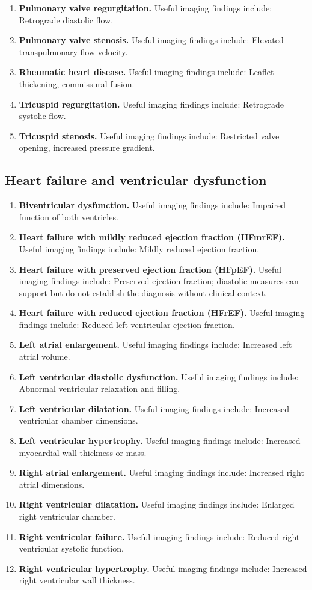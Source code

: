 \begin{enumerate}[leftmargin=*,itemsep=0.45em,topsep=0.4em]
\item \textbf{Pulmonary valve regurgitation.} Useful imaging findings include: Retrograde diastolic flow.
\item \textbf{Pulmonary valve stenosis.} Useful imaging findings include: Elevated transpulmonary flow velocity.
\item \textbf{Rheumatic heart disease.} Useful imaging findings include: Leaflet thickening, commissural fusion.
\item \textbf{Tricuspid regurgitation.} Useful imaging findings include: Retrograde systolic flow.
\item \textbf{Tricuspid stenosis.} Useful imaging findings include: Restricted valve opening, increased pressure gradient.
\end{enumerate}

\subsection{Heart failure and ventricular dysfunction}
\begin{enumerate}[leftmargin=*,itemsep=0.45em,topsep=0.4em]
\item \textbf{Biventricular dysfunction.} Useful imaging findings include: Impaired function of both ventricles.
\item \textbf{Heart failure with mildly reduced ejection fraction (HFmrEF).} Useful imaging findings include: Mildly reduced ejection fraction.
\item \textbf{Heart failure with preserved ejection fraction (HFpEF).} Useful imaging findings include: Preserved ejection fraction; diastolic measures can support but do not establish the diagnosis without clinical context.
\item \textbf{Heart failure with reduced ejection fraction (HFrEF).} Useful imaging findings include: Reduced left ventricular ejection fraction.
\item \textbf{Left atrial enlargement.} Useful imaging findings include: Increased left atrial volume.
\item \textbf{Left ventricular diastolic dysfunction.} Useful imaging findings include: Abnormal ventricular relaxation and filling.
\item \textbf{Left ventricular dilatation.} Useful imaging findings include: Increased ventricular chamber dimensions.
\item \textbf{Left ventricular hypertrophy.} Useful imaging findings include: Increased myocardial wall thickness or mass.
\item \textbf{Right atrial enlargement.} Useful imaging findings include: Increased right atrial dimensions.
\item \textbf{Right ventricular dilatation.} Useful imaging findings include: Enlarged right ventricular chamber.
\item \textbf{Right ventricular failure.} Useful imaging findings include: Reduced right ventricular systolic function.
\item \textbf{Right ventricular hypertrophy.} Useful imaging findings include: Increased right ventricular wall thickness.
\end{enumerate}

